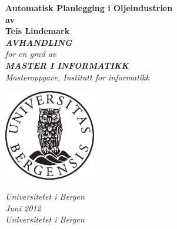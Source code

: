 \documentclass[12pt,twoside,norsk,onecolumn]{article}
\begin{document}
\newcommand{\versjon}{v0.9}

\thispagestyle{empty}
\begin{center}        %
  \vspace{5mm}          %
  \LARGE
  \textbf{Automatisk Planlegging i Oljeindustrien} \\
  \Large
  \vspace{5mm}
  \textbf{av} \\
  \vspace{5mm}
  \large
  \textbf{Teis Lindemark} \\
  \vspace{30mm}
  \Large
  {\bf{\textsl{AVHANDLING}}} \\
  \textsl{for en grad av} \\
  \vspace{2mm}
  {\bf{\textsl{MASTER I INFORMATIKK}}} \\
  \vspace{5mm}
  {\large \textsl {Masteroppgave, Institutt for informatikk}}\\
  \vspace{10mm}
  \centerline{\includegraphics[width=4cm,height=4cm]{uibugle}}
  \vspace{5mm}
  \textsl{Universitetet i Bergen} \\
  \vspace{10mm}
  \large
  \textsl{Juni 2012} \\
  \vspace{5mm}
  \normalsize
  \textsl{Universitetet i Bergen} \\
\end{center}
\newpage
\end{document}
